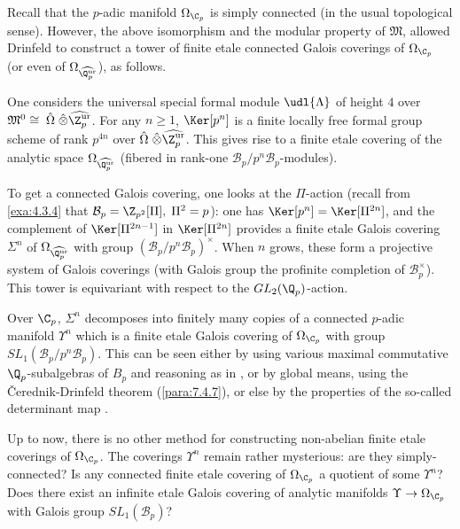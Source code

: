 \begin{para}\label{para:6.3.5} Recall that the $p$-adic manifold
 $\Omega_{\C_p}$ is simply connected (in the usual topological
 sense). However, the above isomorphism and the modular property of
 $\mathfrak{M}$, allowed Drinfeld to construct a tower of finite etale
 connected Galois coverings of $\Omega_{\C_p}$ (or even of
 $\Omega_{\widehat{\Q_p^{\mathrm{ur}}}}$), as follows.


 One considers the universal special formal module $\udl{\Lambda}$ of
 height $4$ over
 $\mathfrak{M}^0\cong\;\hat\Omega\;\hat\otimes\widehat{\Z_p^{\mathrm{ur}}}$. For
 any $n\geq 1$, $\Ker[p^n]$ is a finite locally free formal group scheme
 of rank $p^{4n}$ over
 $\hat\Omega\;\hat\otimes\widehat{\Z_p^{\mathrm{ur}}}$. This gives rise to a
 finite etale covering of the analytic space
 $\Omega_{\widehat{\Q_p^{\mathrm{ur}}}}$ (fibered in rank-one
 $\mathcal{B}_p/p^n\mathcal{B}_p$-modules).


 To get a connected Galois covering, one looks at the $\Pi$-action
 (recall from \ref{exa:4.3.4} that $\mathcal{B}_p=\Z_{p^2}[\Pi],\;\Pi^2=p$): one
 has $\Ker[p^n]=\Ker[\Pi^{2n}]$, and the complement of $\Ker[\Pi^{2n-1}]$
 in $\Ker[\Pi^{2n}]$ provides a finite etale Galois covering $\Sigma^n$
 of $\Omega_{\widehat{\Q_p^{\mathrm{ur}}}}$ with group
 $(\mathcal{B}_p/p^n\mathcal{B}_p)^\times$. When $n$ grows, these form a
 projective system of Galois coverings (with Galois group the profinite
 completion of $\mathcal{B}_p^\times$). This tower is equivariant with
 respect to the $GL_2(\Q_p)$-action.

 Over $\C_p$, $\Sigma^n$ decomposes into finitely many copies of
 a connected $p$-adic manifold $\Upsilon^n$ which is a finite etale
 Galois covering of $\Omega_{\C_p}$ with group
 $SL_1(\mathcal{B}_p/p^n\mathcal{B}_p)$.  This can be seen either by
 using various maximal commutative $\Q_p$-subalgebras of $B_p$ and
 reasoning as in \cite[1.4.6]{varshavsky98:_shimur}, or by global means, using the
 \v{C}erednik-Drinfeld theorem (\ref{para:7.4.7}), or else by the
 properties of the so-called determinant map \cite[II]{tpuosc}.


Up to now, there is no other method for constructing non-abelian finite
etale coverings of $\Omega_{\C_p}$. The coverings $\Upsilon^n$ remain
rather mysterious: are they simply-connected? Is any connected finite
etale covering of $\Omega_{\C_p}$ a quotient of some $\Upsilon^n$? Does
there exist an infinite etale Galois covering of analytic manifolds
$\Upsilon\rightarrow \Omega_{\C_p}$ with Galois group
$SL_1(\mathcal{B}_p)$?



\end{para}
